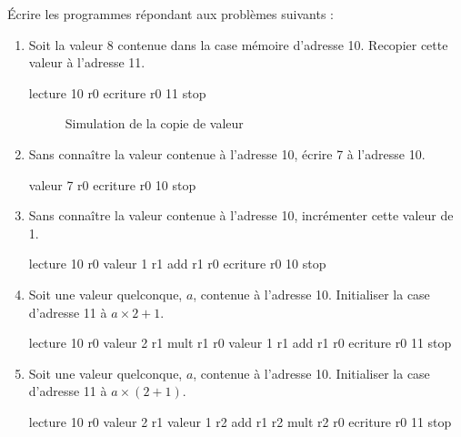 Écrire les programmes répondant aux problèmes suivants :
\begin{enumerate}
\item Soit la valeur 8 contenue dans la case mémoire d'adresse 10. Recopier cette valeur à l'adresse 11.
  \begin{correction}%
    \begin{listing}{1}
      lecture 10 r0
      ecriture r0 11
      stop
    \end{listing}

\begin{figure} %
  \centering
  
  \caption{Simulation de la copie de valeur}
  \label{trace_copie_val}
\end{figure}
  \end{correction}
\item Sans connaître la valeur contenue à l'adresse 10, écrire 7 à l'adresse 10.
  \begin{correction}%
    \begin{listing}{1}
      valeur 7 r0
      ecriture r0 10
      stop
    \end{listing}
  \end{correction}
\item Sans connaître la valeur contenue à l'adresse 10, incrémenter cette valeur de 1.
  \begin{correction}%
    \begin{listing}{1}
      lecture 10 r0
      valeur 1 r1
      add r1 r0
      ecriture r0 10
      stop
    \end{listing}
  \end{correction}
\item Soit une valeur quelconque, $a$, contenue à l'adresse 10. Initialiser la case d'adresse 11 à $a \times 2 + 1$.
  \begin{correction}%
    \begin{listing}{1}
      lecture 10 r0
      valeur 2 r1
      mult r1 r0
      valeur 1 r1
      add r1 r0
      ecriture r0 11
      stop
    \end{listing}
  \end{correction}
\item Soit une valeur quelconque, $a$, contenue à l'adresse 10. Initialiser la case d'adresse 11 à $a \times (2 + 1)$.
  \begin{correction}%
    \begin{listing}{1}
      lecture 10 r0
      valeur 2 r1
      valeur 1 r2
      add r1 r2
      mult r2 r0
      ecriture r0 11
      stop
    \end{listing}
  \end{correction}
\end{enumerate}

